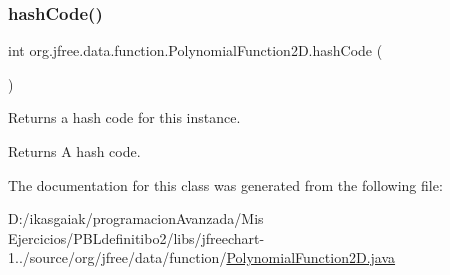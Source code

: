 \subsubsection{\texorpdfstring{hash\+Code()}{hashCode()}}
{\footnotesize\ttfamily int org.\+jfree.\+data.\+function.\+Polynomial\+Function2\+D.\+hash\+Code (\begin{DoxyParamCaption}{ }\end{DoxyParamCaption})}

Returns a hash code for this instance.

\begin{DoxyReturn}{Returns}
A hash code. 
\end{DoxyReturn}


The documentation for this class was generated from the following file\+:\begin{DoxyCompactItemize}
\item 
D\+:/ikasgaiak/programacion\+Avanzada/\+Mis Ejercicios/\+P\+B\+Ldefinitibo2/libs/jfreechart-\/1../source/org/jfree/data/function/\mbox{\hyperlink{_polynomial_function2_d_8java}{Polynomial\+Function2\+D.\+java}}\end{DoxyCompactItemize}
